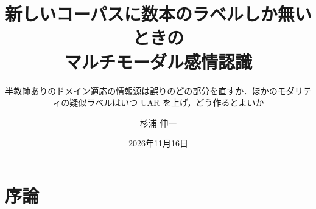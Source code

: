 \newcommand{\T}[2]{#1}
\newcommand{\msg}[1]{\par\vspace{0.25em}{\centering\large #1\par}}
\newcommand{\fnote}[1]{\par\vfill{\tiny\color{mMuted}#1\par}}
\newcommand{\notreal}{\par{\tiny\color{mMuted}模式図．実験の値ではない}\par}
\newcommand{\figsrc}[1]{\par\vspace{-0.2em}\hfill{\tiny\color{mMuted}#1}\par}
\newcommand{\pt}{点}
\newcommand{\qbox}[2]{\par\noindent\fcolorbox{#1}{#1!8}{\parbox{\dimexpr\linewidth-2\fboxsep-2\fboxrule}{\raggedright\scriptsize #2}}\par\vspace{0.3em}}

\title{新しいコーパスに数本のラベルしか無いときの\\マルチモーダル感情認識}
\subtitle{半教師ありのドメイン適応の情報源は誤りのどの部分を直すか．ほかのモダリティの疑似ラベルはいつ UAR を上げ，どう作るとよいか}
\author{杉浦 伸一}
\date{2026年11月16日}


\maketitle

\section{序論}

